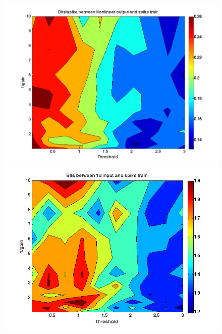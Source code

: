 \documentclass[12pt]{article}
\begin{document}
\begin{figure}[h!!]
\centering
\begin{minipage}[b]{0.3\linewidth}
\centering
\includegraphics[width=\textwidth]{4f_contour_LNPsimulation_ONcell_highCenter.png}
\end{minipage}
\begin{minipage}[b]{0.3\linewidth}
\centering
\includegraphics[width=\textwidth]{4f_contour_LNPsimulation_ONcell_longFilter.png}
\end{minipage}
\begin{minipage}[b]{0.3\linewidth}
\centering

\end{minipage}
\end{figure}
\end{document}
